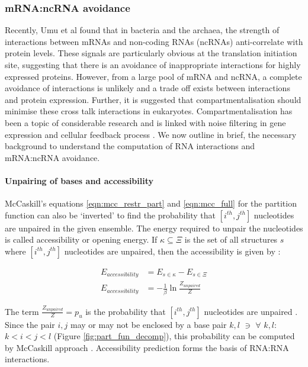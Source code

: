 \subsubsection{mRNA:ncRNA avoidance}
Recently, Umu et al \cite{Umu2016-zq} found that in bacteria and the archaea, the strength of interactions between mRNAs and non-coding RNAs (ncRNAs) anti-correlate with protein levels. These signals are particularly obvious at the translation initiation site, suggesting that there is an avoidance of inappropriate interactions for highly expressed proteins. However, from a large pool of mRNA and ncRNA, a complete avoidance of interactions is unlikely and a trade off exists between interactions and protein expression. Further, it is suggested that compartmentalisation should minimise these cross talk interactions in eukaryotes. Compartmentalisation has been a topic of considerable research and is linked with noise filtering in gene expression and cellular feedback process \cite{rao2002control, stoeger2016passive, banani2017biomolecular, dong2017shaping}. We now outline in brief, the necessary background to understand the computation of RNA interactions and mRNA:ncRNA avoidance.


\paragraph{Unpairing of bases and accessibility}
McCaskill’s equations \ref{eqn:mcc_restr_part} and \ref{eqn:mcc_full} for the partition function can also be `inverted' to find the probability that $[i^{th}, j^{th}]$ nucleotides are unpaired in the given ensemble. The energy required to unpair the nucleotides is called accessibility or opening energy. If $\kappa \subseteq \Xi$ is the set of all structures $s$ where $[i^{th}, j^{th}]$ nucleotides are unpaired, then the accessibility is given by :

\begin{equation}
\begin{aligned}
    E_{accessibility} &= E_{s \in \kappa} - E_{s \in \Xi}\\
    E_{accessibility} &= -\frac{1}{\beta}\ln{\frac{Z_{unpaired}}{Z}}
\end{aligned}
\end{equation}

The term $\frac{Z_{unpaired}}{Z} = p_u$ is the probability that $[i^{th}, j^{th}]$  nucleotides  are unpaired \cite{Bernhart2011-cc}. Since the pair $i,j$ may or may not be enclosed by a base pair $k,l$ $\ni$ $\forall$ $k,l :$ $ k < i  < j < l$ (Figure \ref{fig:part_fun_decomp}), this probability can be computed by McCaskill approach \cite{Bernhart2011-cc}. Accessibility prediction forms the basis of RNA:RNA interactions. 



